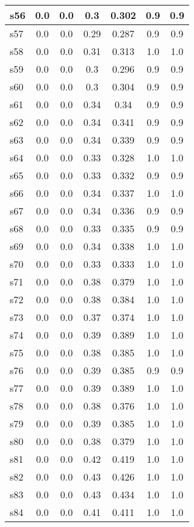 \documentclass{article}
\begin{document}
\begin{tabular}{|l|c|c|c|c|c|c|}
\hline
s56 &0.0 & 0.0 & 0.3 & 0.302 & 0.9 & 0.9\\
\hline
s57 &0.0 & 0.0 & 0.29 & 0.287 & 0.9 & 0.9\\
\hline
s58 &0.0 & 0.0 & 0.31 & 0.313 & 1.0 & 1.0\\
\hline
s59 &0.0 & 0.0 & 0.3 & 0.296 & 0.9 & 0.9\\
\hline
s60 &0.0 & 0.0 & 0.3 & 0.304 & 0.9 & 0.9\\
\hline
s61 &0.0 & 0.0 & 0.34 & 0.34 & 0.9 & 0.9\\
\hline
s62 &0.0 & 0.0 & 0.34 & 0.341 & 0.9 & 0.9\\
\hline
s63 &0.0 & 0.0 & 0.34 & 0.339 & 0.9 & 0.9\\
\hline
s64 &0.0 & 0.0 & 0.33 & 0.328 & 1.0 & 1.0\\
\hline
s65 &0.0 & 0.0 & 0.33 & 0.332 & 0.9 & 0.9\\
\hline
s66 &0.0 & 0.0 & 0.34 & 0.337 & 1.0 & 1.0\\
\hline
s67 &0.0 & 0.0 & 0.34 & 0.336 & 0.9 & 0.9\\
\hline
s68 &0.0 & 0.0 & 0.33 & 0.335 & 0.9 & 0.9\\
\hline
s69 &0.0 & 0.0 & 0.34 & 0.338 & 1.0 & 1.0\\
\hline
s70 &0.0 & 0.0 & 0.33 & 0.333 & 1.0 & 1.0\\
\hline
s71 &0.0 & 0.0 & 0.38 & 0.379 & 1.0 & 1.0\\
\hline
s72 &0.0 & 0.0 & 0.38 & 0.384 & 1.0 & 1.0\\
\hline
s73 &0.0 & 0.0 & 0.37 & 0.374 & 1.0 & 1.0\\
\hline
s74 &0.0 & 0.0 & 0.39 & 0.389 & 1.0 & 1.0\\
\hline
s75 &0.0 & 0.0 & 0.38 & 0.385 & 1.0 & 1.0\\
\hline
s76 &0.0 & 0.0 & 0.39 & 0.385 & 0.9 & 0.9\\
\hline
s77 &0.0 & 0.0 & 0.39 & 0.389 & 1.0 & 1.0\\
\hline
s78 &0.0 & 0.0 & 0.38 & 0.376 & 1.0 & 1.0\\
\hline
s79 &0.0 & 0.0 & 0.39 & 0.385 & 1.0 & 1.0\\
\hline
s80 &0.0 & 0.0 & 0.38 & 0.379 & 1.0 & 1.0\\
\hline
s81 &0.0 & 0.0 & 0.42 & 0.419 & 1.0 & 1.0\\
\hline
s82 &0.0 & 0.0 & 0.43 & 0.426 & 1.0 & 1.0\\
\hline
s83 &0.0 & 0.0 & 0.43 & 0.434 & 1.0 & 1.0\\
\hline
s84 &0.0 & 0.0 & 0.41 & 0.411 & 1.0 & 1.0\\

\end{tabular}
\end{document}
